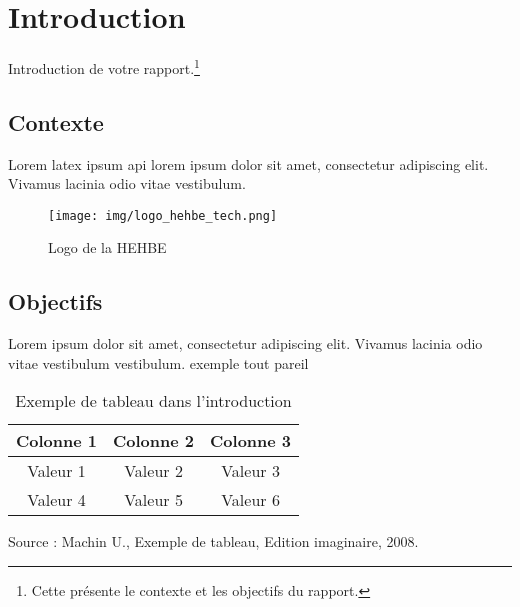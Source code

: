 \chapter{Introduction}
Introduction de votre rapport.\footnote{Cette présente le contexte et les objectifs du rapport.}

\section{Contexte}
Lorem \gls{latex} ipsum \gls{api} lorem ipsum dolor sit amet, consectetur adipiscing elit. Vivamus lacinia odio vitae vestibulum.

\begin{figure}[!ht]
    \centering
    \texttt{[image: img/logo\_hehbe\_tech.png]}
    \caption{Logo de la HEHBE}
    \label{fig: logo heh}
\end{figure}

\section{Objectifs}
Lorem ipsum dolor  sit amet, consectetur adipiscing elit. Vivamus lacinia odio vitae vestibulum vestibulum.
\gls{exemple} tout pareil
\begin{table}[!ht]
    \centering
    \begin{tabular}{|c|c|c|}
        \hline
        Colonne 1 & Colonne 2 & Colonne 3 \\
        \hline
        Valeur 1 & Valeur 2 & Valeur 3 \\
        \hline
        Valeur 4 & Valeur 5 & Valeur 6 \\
        \hline
    \end{tabular}
    \caption{Exemple de tableau dans l'introduction}
    \label{tab:example_table}
    \vspace{0.2cm} %
    Source :  Machin U., Exemple de tableau, Edition imaginaire, 2008.
\end{table}